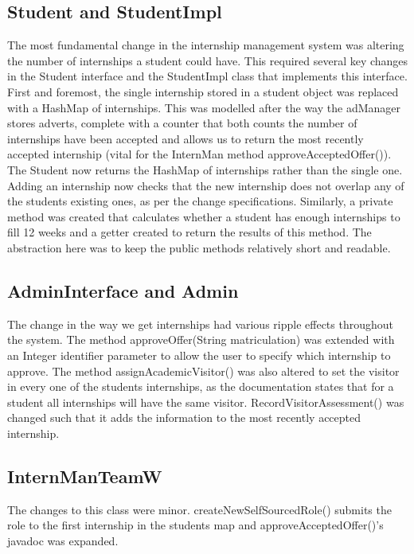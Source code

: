 \documentclass[11pt]{l3deliverable}
\begin{document}
\subsection{Student and StudentImpl}

The most fundamental change in the internship management system was altering the
number of internships a student could have. This required several key changes
in the Student interface and the StudentImpl class that implements this interface.
First and foremost, the single internship stored in a student object was replaced 
with a HashMap of internships. This was modelled after the way the adManager stores
adverts, complete with a counter that both counts the number of internships have been 
accepted and allows us to return the most recently accepted internship (vital for the 
InternMan method approveAcceptedOffer()). The Student now returns the HashMap of 
internships rather than the single one. Adding an internship now checks that the new
internship does not overlap any of the students existing ones, as per the change 
specifications. Similarly, a private method was created that calculates whether a
student has enough internships to fill 12 weeks and a getter created to return the 
results of this method. The abstraction here was to keep the public methods relatively
short and readable.

\subsection{AdminInterface and Admin}

The change in the way we get internships had various ripple effects throughout the 
system. The method approveOffer(String matriculation) was extended with an Integer
identifier parameter to allow the user to specify which internship to approve. The 
method assignAcademicVisitor() was also altered to set the visitor in every one of
the students internships, as the documentation states that for a student all 
internships will have the same visitor. RecordVisitorAssessment() was changed such
that it adds the information to the most recently accepted internship.

\subsection{InternManTeamW}

The changes to this class were minor. createNewSelfSourcedRole() submits the role to
the first internship in the students map and approveAcceptedOffer()'s javadoc was 
expanded. 
\end{document}
